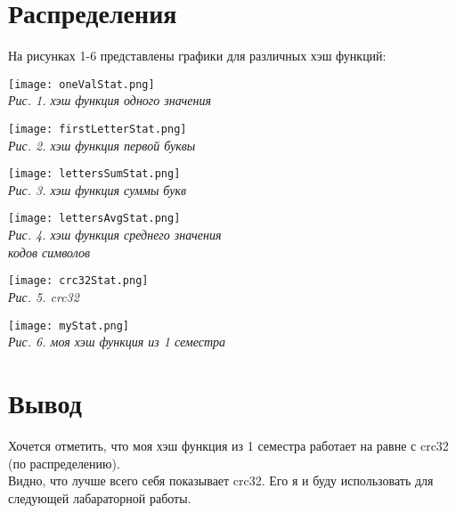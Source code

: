 
\section{ Распределения }
На рисунках 1-6 представлены графики для различных хэш функций:

\noindent\begin{minipage}[h!]{0.45\linewidth}
    \begin{center}
        \texttt{[image: oneValStat.png]} \\
        \textit{Рис. 1. хэш функция одного значения }
    \end{center} 
\end{minipage}
\begin{minipage}[h!]{0.45\linewidth}
    \begin{center}
        \texttt{[image: firstLetterStat.png]} \\
        \textit{Рис. 2. хэш функция первой буквы }
    \end{center} 
\end{minipage}

\noindent\begin{minipage}[h!]{0.45\linewidth}
    \begin{center}
        \texttt{[image: lettersSumStat.png]} \\
        \textit{Рис. 3. хэш функция суммы букв }
    \end{center} 
\end{minipage}
\begin{minipage}[h!]{0.45\linewidth}
    \begin{center}
        \texttt{[image: lettersAvgStat.png]} \\
        \textit{Рис. 4. хэш функция среднего значения\\ кодов символов }
    \end{center} 
\end{minipage}

\noindent\begin{minipage}[h!]{0.45\linewidth}
    \begin{center}
        \texttt{[image: crc32Stat.png]} \\
        \textit{Рис. 5. crc32 }
    \end{center} 
\end{minipage}
\noindent\begin{minipage}[h!]{0.45\linewidth}
    \begin{center}
        \texttt{[image: myStat.png]} \\
        \textit{Рис. 6. моя хэш функция из 1 семестра }
    \end{center} 
\end{minipage}

\newpage

\section{ Вывод }

Хочется отметить, что моя хэш функция из 1 семестра работает на равне с crc32 (по распределению). \\ [0.1cm]
Видно, что лучше всего себя показывает crc32. Его я и буду использовать для следующей лабараторной работы.